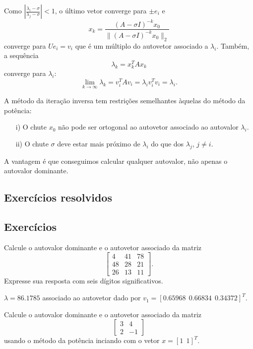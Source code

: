 Como $\left|\frac{\lambda_i-\sigma}{\lambda_j-\sigma}\right|<1$, o último vetor converge para $\pm e_i$ e
$$
x_k=\frac{(A-\sigma I)^{-k}x_0}{\|(A-\sigma I)^{-k}x_0\|_2}
$$
converge para $Ue_i=v_i$ que é um múltiplo do autovetor associado a $\lambda_i$. Também, a sequência
$$
\lambda_k=x_k^TAx_k
$$
converge para $\lambda_i$:
$$
\lim_{k\to\infty}\lambda_k= v_i^TA v_i=\lambda_iv_i^Tv_i=\lambda_i.
$$

A método da iteração inversa tem restrições semelhantes àquelas do método da potência:
\begin{itemize}
 \item[i)] O chute $x_0$ não pode ser ortogonal ao autovetor associado ao autovalor $\lambda_i$.
 \item[ii)] O chute $\sigma$ deve estar mais próximo de $\lambda_i$ do que dos $\lambda_j$, $j\neq i$.
\end{itemize}
A vantagem é que conseguimos calcular qualquer autovalor, não apenas o autovalor dominante.

\subsection*{Exercícios resolvidos}

\construirExeresol

\subsection*{Exercícios}

\begin{exer} Calcule o autovalor dominante e o autovetor associado da matriz
$$\left[\begin{array}{ccc}
 4&     41  &  78\\
 48   & 28&    21  \\
 26   & 13 &   11
\end{array}\right].
$$
Expresse sua resposta com seis dígitos significativos.
\end{exer}
\begin{resp}
$\lambda=86.1785$ associado ao autovetor dado por $v_1=\left[ 0.65968~~ 0.66834~~ 0.34372\right]^T$.
\end{resp}

\begin{exer}Calcule o autovalor dominante e o autovetor associado da matriz
$$
\left[\begin{array}{cc}
3&4\\2&-1
\end{array}\right]
$$
usando o método da potência inciando com o vetor $x=[1~~  1]^T$.
\end{exer}
\begin{resp}
  \construirResp
\end{resp}

